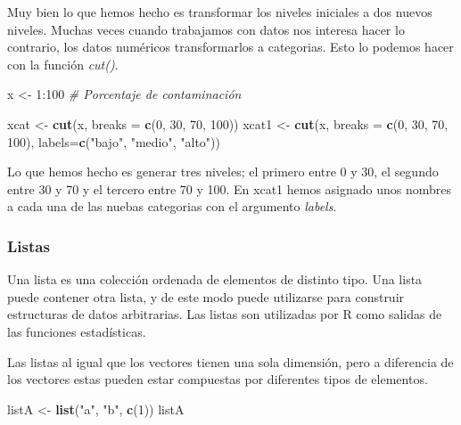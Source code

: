 \documentclass[]{article}
\newenvironment{Shaded}{\begin{snugshade}}{\end{snugshade}}
\newcommand{\KeywordTok}[1]{\textcolor[rgb]{0.13,0.29,0.53}{\textbf{{#1}}}}
\newcommand{\DataTypeTok}[1]{\textcolor[rgb]{0.13,0.29,0.53}{{#1}}}
\newcommand{\DecValTok}[1]{\textcolor[rgb]{0.00,0.00,0.81}{{#1}}}
\newcommand{\StringTok}[1]{\textcolor[rgb]{0.31,0.60,0.02}{{#1}}}
\newcommand{\CommentTok}[1]{\textcolor[rgb]{0.56,0.35,0.01}{\textit{{#1}}}}
\newcommand{\NormalTok}[1]{{#1}}
\begin{document}
Muy bien lo que hemos hecho es transformar los niveles iniciales a dos
nuevos niveles. Muchas veces cuando trabajamos con datos nos interesa
hacer lo contrario, los datos numéricos transformarlos a categorias.
Esto lo podemos hacer con la función \emph{cut()}.

\begin{Shaded}
\begin{Highlighting}[]
\NormalTok{x <-}\StringTok{ }\DecValTok{1}\NormalTok{:}\DecValTok{100} \CommentTok{# Porcentaje de contaminación}

\NormalTok{xcat <-}\StringTok{ }\KeywordTok{cut}\NormalTok{(x, }\DataTypeTok{breaks =} \KeywordTok{c}\NormalTok{(}\DecValTok{0}\NormalTok{, }\DecValTok{30}\NormalTok{, }\DecValTok{70}\NormalTok{, }\DecValTok{100}\NormalTok{))}
\NormalTok{xcat1 <-}\StringTok{ }\KeywordTok{cut}\NormalTok{(x, }\DataTypeTok{breaks =} \KeywordTok{c}\NormalTok{(}\DecValTok{0}\NormalTok{, }\DecValTok{30}\NormalTok{, }\DecValTok{70}\NormalTok{, }\DecValTok{100}\NormalTok{), }\DataTypeTok{labels=}\KeywordTok{c}\NormalTok{(}\StringTok{"bajo"}\NormalTok{, }\StringTok{"medio"}\NormalTok{, }\StringTok{"alto"}\NormalTok{))}
\end{Highlighting}
\end{Shaded}

Lo que hemos hecho es generar tres niveles; el primero entre 0 y 30, el
segundo entre 30 y 70 y el tercero entre 70 y 100. En xcat1 hemos
asignado unos nombres a cada una de las nuebas categorias con el
argumento \emph{labels}.

\subsubsection{Listas}\label{listas}

Una lista es una colección ordenada de elementos de distinto tipo. Una
lista puede contener otra lista, y de este modo puede utilizarse para
construir estructuras de datos arbitrarias. Las listas son utilizadas
por R como salidas de las funciones estadísticas.

Las listas al igual que los vectores tienen una sola dimensión, pero a
diferencia de los vectores estas pueden estar compuestas por diferentes
tipos de elementos.

\begin{Shaded}
\begin{Highlighting}[]
\NormalTok{listA <-}\StringTok{ }\KeywordTok{list}\NormalTok{(}\StringTok{"a"}\NormalTok{, }\StringTok{"b"}\NormalTok{, }\KeywordTok{c}\NormalTok{(}\DecValTok{1}\NormalTok{))}
\NormalTok{listA}
\end{Highlighting}
\end{Shaded}
\end{document}
